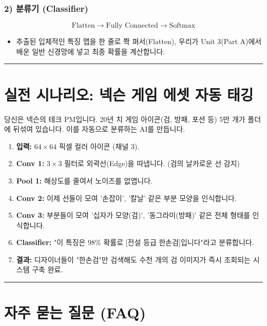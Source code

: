 \documentclass[11pt,a4paper]{book}
\theoremstyle{definition}
\begin{document}
\subsubsection*{2) 분류기 (Classifier)}
$$ \text{Flatten} \to \text{Fully Connected} \to \text{Softmax} $$
\begin{itemize}
    \item 추출된 입체적인 특징 맵을 한 줄로 쫙 펴서(Flatten), 우리가 Unit 3(Part A)에서 배운 일반 신경망에 넣고 최종 확률을 계산합니다.
\end{itemize}

\vspace{0.5cm}\hrule\vspace{0.5cm}

\section{실전 시나리오: 넥슨 게임 에셋 자동 태깅}

\begin{storybox}[title={Scenario: 수만 개의 아이콘 정리하기}]
당신은 넥슨의 테크 PM입니다. 20년 치 게임 아이콘(검, 방패, 포션 등) 5만 개가 폴더에 뒤섞여 있습니다. 이를 자동으로 분류하는 AI를 만듭니다.
\end{storybox}

\begin{enumerate}
    \item \textbf{입력:} $64 \times 64$ 픽셀 컬러 아이콘 (채널 3).
    \item \textbf{Conv 1:} $3 \times 3$ 필터로 외곽선(Edge)을 따냅니다. (검의 날카로운 선 감지)
    \item \textbf{Pool 1:} 해상도를 줄여서 노이즈를 없앱니다.
    \item \textbf{Conv 2:} 이제 선들이 모여 '손잡이', '칼날' 같은 부분 모양을 인식합니다.
    \item \textbf{Conv 3:} 부분들이 모여 '십자가 모양(검)', '동그라미(방패)' 같은 전체 형태를 인식합니다.
    \item \textbf{Classifier:} "이 특징은 98\% 확률로 [전설 등급 한손검]입니다"라고 분류합니다.
    \item \textbf{결과:} 디자이너들이 "한손검"만 검색해도 수천 개의 검 이미지가 즉시 조회되는 시스템 구축 완료.
\end{enumerate}

\vspace{0.5cm}\hrule\vspace{0.5cm}

\section{자주 묻는 질문 (FAQ)}
\end{document}
